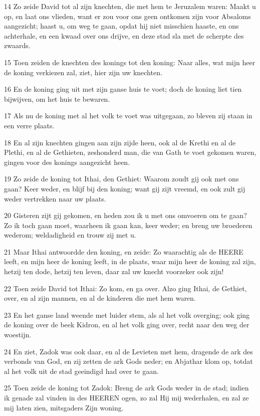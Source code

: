 \par 14 Zo zeide David tot al zijn knechten, die met hem te Jeruzalem waren: Maakt u op, en laat ons vlieden, want er zou voor ons geen ontkomen zijn voor Absaloms aangezicht; haast u, om weg te gaan, opdat hij niet misschien haaste, en ons achterhale, en een kwaad over ons drijve, en deze stad sla met de scherpte des zwaards.
\par 15 Toen zeiden de knechten des konings tot den koning: Naar alles, wat mijn heer de koning verkiezen zal, ziet, hier zijn uw knechten.
\par 16 En de koning ging uit met zijn ganse huis te voet; doch de koning liet tien bijwijven, om het huis te bewaren.
\par 17 Als nu de koning met al het volk te voet was uitgegaan, zo bleven zij staan in een verre plaats.
\par 18 En al zijn knechten gingen aan zijn zijde heen, ook al de Krethi en al de Plethi, en al de Gethieten, zeshonderd man, die van Gath te voet gekomen waren, gingen voor des konings aangezicht heen.
\par 19 Zo zeide de koning tot Ithai, den Gethiet: Waarom zoudt gij ook met ons gaan? Keer weder, en blijf bij den koning; want gij zijt vreemd, en ook zult gij weder vertrekken naar uw plaats.
\par 20 Gisteren zijt gij gekomen, en heden zou ik u met ons omvoeren om te gaan? Zo ik toch gaan moet, waarheen ik gaan kan, keer weder; en breng uw broederen wederom; weldadigheid en trouw zij met u.
\par 21 Maar Ithai antwoordde den koning, en zeide: Zo waarachtig als de HEERE leeft, en mijn heer de koning leeft, in de plaats, waar mijn heer de koning zal zijn, hetzij ten dode, hetzij ten leven, daar zal uw knecht voorzeker ook zijn!
\par 22 Toen zeide David tot Ithai: Zo kom, en ga over. Alzo ging Ithai, de Gethiet, over, en al zijn mannen, en al de kinderen die met hem waren.
\par 23 En het ganse land weende met luider stem, als al het volk overging; ook ging de koning over de beek Kidron, en al het volk ging over, recht naar den weg der woestijn.
\par 24 En ziet, Zadok was ook daar, en al de Levieten met hem, dragende de ark des verbonds van God, en zij zetten de ark Gods neder; en Abjathar klom op, totdat al het volk uit de stad geeindigd had over te gaan.
\par 25 Toen zeide de koning tot Zadok: Breng de ark Gods weder in de stad; indien ik genade zal vinden in des HEEREN ogen, zo zal Hij mij wederhalen, en zal ze mij laten zien, mitsgaders Zijn woning.
